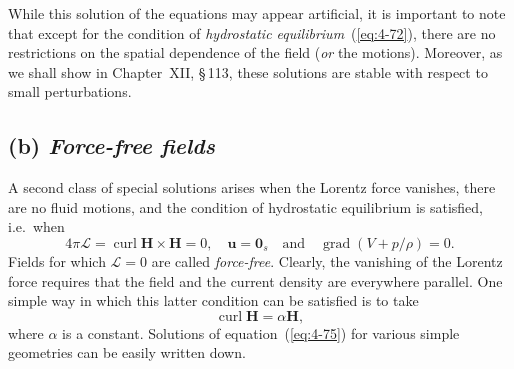 While this solution of the equations may appear artificial, it is important to note that except for the condition of \emph{hydrostatic equilibrium}~(\ref{eq:4-72}), there are no restrictions on the spatial dependence of the field (\emph{or} the motions). Moreover, as we shall show in Chapter~XII, \S\,113, these solutions are stable with respect to small perturbations.

\subsection*{(b) \emph{Force-free fields}}

A second class of special solutions arises when the Lorentz force vanishes, there are no fluid motions, and the condition of hydrostatic equilibrium is satisfied, i.e.\ when
\begin{equation}
\label{eq:4-74}
4\pi\boldsymbol{\mathscr{L}} = \operatorname{curl}\mathbf{H}\times\mathbf{H} = 0, \quad \mathbf{u}=\mathbf{0}_s \quad \text{and} \quad \operatorname{grad}(V+p/\rho) = 0.
\end{equation}
Fields for which $\boldsymbol{\mathscr{L}}=0$ are called \emph{force-free}. Clearly, the vanishing of the Lorentz force requires that the field and the current density are everywhere parallel. One simple way in which this latter condition can be satisfied is to take
\begin{equation}
\label{eq:4-75}
\operatorname{curl}\mathbf{H} = \alpha\mathbf{H},
\end{equation}
where $\alpha$ is a constant. Solutions of equation~(\ref{eq:4-75}) for various simple geometries can be easily written down.

